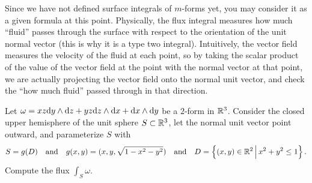 \documentclass[11pt,a4paper]{article}
\begin{document}
\begin{remark}
  Since we have not defined surface integrals of $m$-forms yet,
  you may consider it as a given formula at this point.
  Physically, the flux integral measures how much ``fluid''
  passes through the surface with respect to the orientation of
  the unit normal vector (this is why it is a type two integral).
  Intuitively, the vector field measures the velocity
  of the fluid at each point,
  so by taking the scalar product of the value of the vector field at
  the point with the normal vector at that point,
  we are actually projecting the vector field onto the normal unit vector,
  and check the ``how much fluid'' passed through in that direction.
\end{remark}

\begin{exercise}
  Let $\omega = xz \dy \wedge \dz + yz \dz \wedge \dx + \dx \wedge \dy$
  be a $2$-form in $\mathbb{R}^3$.
  Consider the closed upper hemisphere of the unit sphere $S \subset \mathbb{R}^3$,
  let the normal unit vector point outward, and parameterize $S$
  with
  \[
    S = g(D) \quad \text{and} \quad
    g(x,y) = (x,y,\sqrt{1 - x^2 - y^2}) \quad \text{and} \quad
    D = \left\{(x,y) \in \mathbb{R}^2 \,\middle\vert\, x^2 + y^2 \le 1\right\}.
  \]
  Compute the flux $\int_S \omega$.
\end{exercise}
\end{document}
